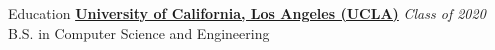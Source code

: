 \documentclass{comran_morshed_resume}
\begin{document}
\begin{rSection}{Education}
    {\bf\href{https://ucla.edu}{University of California, Los Angeles (UCLA)}} \hfill {\textit{Class of 2020}} \\
    B.S. in Computer Science and Engineering
\end{rSection}

\end{document}
